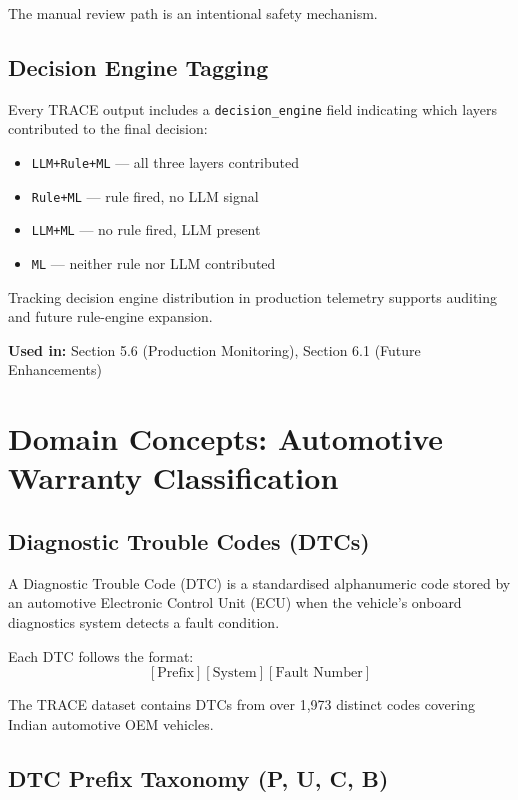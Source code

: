 \documentclass[10pt]{article}
\begin{document}
The manual review path is an intentional safety mechanism.

\subsection{Decision Engine Tagging}

Every TRACE output includes a \texttt{decision\_engine} field indicating which layers contributed to the final decision:

\begin{itemize}
    \item \texttt{LLM+Rule+ML} --- all three layers contributed
    \item \texttt{Rule+ML} --- rule fired, no LLM signal
    \item \texttt{LLM+ML} --- no rule fired, LLM present
    \item \texttt{ML} --- neither rule nor LLM contributed
\end{itemize}

Tracking decision engine distribution in production telemetry supports auditing and future rule-engine expansion.

\textbf{Used in:} Section 5.6 (Production Monitoring), Section 6.1 (Future Enhancements)

\section{Domain Concepts: Automotive Warranty Classification}

\subsection{Diagnostic Trouble Codes (DTCs)}

A Diagnostic Trouble Code (DTC) is a standardised alphanumeric code stored by an automotive Electronic Control Unit (ECU) when the vehicle's onboard diagnostics system detects a fault condition.

Each DTC follows the format:
\[
[\text{Prefix}][\text{System}][\text{Fault Number}]
\]

The TRACE dataset contains DTCs from over 1,973 distinct codes covering Indian automotive OEM vehicles.

\subsection{DTC Prefix Taxonomy (P, U, C, B)}
\end{document}
